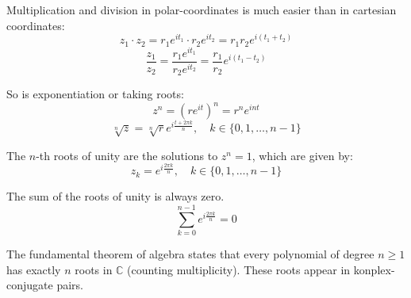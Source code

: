 Multiplication and division in polar-coordinates is much easier than in cartesian coordinates:
$$z_1 \cdot z_2 = r_1 e^{it_1} \cdot r_2 e^{it_2} = r_1 r_2 e^{i(t_1 + t_2)}$$
$$\frac{z_1}{z_2} = \frac{r_1 e^{it_1}}{r_2 e^{it_2}} = \frac{r_1}{r_2} e^{i(t_1 - t_2)} $$

So is exponentiation or taking roots:
$$z^n = (r e^{it})^n = r^n e^{int}$$
$$\sqrt[n]{z} = \sqrt[n]{r} e^{i\frac{t+2\pi k}{n}}, \quad k \in \{0, 1, \dots, n-1\}$$

\begin{definition}
The $n$-th roots of unity are the solutions to $z^n = 1$, which are given by:
$$z_k = e^{i\frac{2\pi k}{n}}, \quad k \in \{0, 1, \dots, n-1\}$$
\end{definition}

\begin{theorem}
The sum of the roots of unity is always zero.
$$\sum_{k=0}^{n-1} e^{i\frac{2\pi k}{n}} = 0$$
\end{theorem}

\begin{theorem}
The fundamental theorem of algebra states that every polynomial of degree $n \geq 1$ has exactly $n$ roots in $\mathbb{C}$ (counting multiplicity). These roots appear in konplex-conjugate pairs.
\end{theorem}
